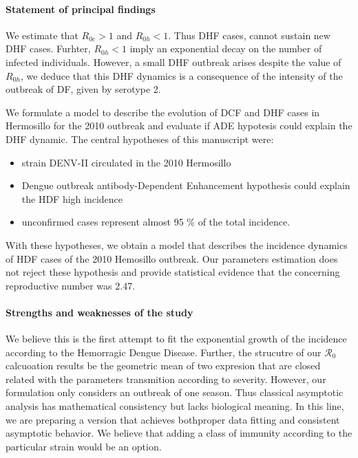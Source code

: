     \paragraph{Statement of principal findings}
        We estimate that $R_{0c}>1$ and  $R_{0h}<1$. Thus DHF cases, 
    cannot sustain new DHF cases. Furhter, $R_{0h}<1$ imply an
    exponential decay on the number of infected individuals. However,
    a small DHF outbreak arises despite the value of $R_{0h}$, we deduce
    that this DHF dynamics is a consequence of the
    intensity of the outbreak of DF, given by serotype 2.

        We formulate a  model to describe the evolution of DCF and DHF
    cases in Hermosillo for the 2010 outbreak and evaluate if ADE
    hypotesis could explain the DHF dynamic. 
    The central hypotheses of this manuscript were:
        \begin{itemize}
            \item
                strain DENV-II circulated in the 2010 Hermosillo 
            \item
                Dengue outbreak antibody-Dependent Enhancement hypothesis
                could explain the HDF high incidence 
            \item
                unconfirmed cases represent almost 95 \% of the total
                incidence.
        \end{itemize}
        With these hypotheses, we obtain a model that describes
    the incidence dynamics of HDF cases of the 2010 Hemosillo outbreak.
    Our parameters estimation does not reject these hypothesis and provide
    statistical evidence that the concerning reproductive number was \num{2.47}.
    
    \paragraph{Strengths and weaknesses of the study}
        We believe this is the first attempt to fit the exponential 
    growth of the incidence according to the Hemorragic Dengue Disease. 
    Further, the strucutre of our $\mathcal{R}_0$ calcuoation results be 
    the geometric mean of two expresion that are closed related 
    with the parameters transmition according to severity.  
    However, our formulation only considers an outbreak of one season.
    Thus classical asymptotic analysis has mathematical consistency
    but lacks biological meaning.  In this line, we are preparing a
    version that achieves both\textemdash proper data fitting and consistent
    asymptotic behavior. We believe that adding a class of immunity
    according to the particular strain would be an option.

